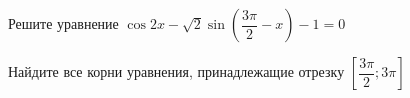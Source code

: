 \begin{ex}
	\begin{condition}
		\begin{enumcols}[label=\asbuk*)]
			\item Решите уравнение \( \cos 2x-\sqrt{2}\sin{\left(\dfrac{3\pi}{2}-x\right)}  - 1= 0 \)
			\item Найдите все корни уравнения, принадлежащие отрезку \( \left[\dfrac{3\pi}{2};3\pi\right]  \)
		\end{enumcols}
	\end{condition}
\end{ex}